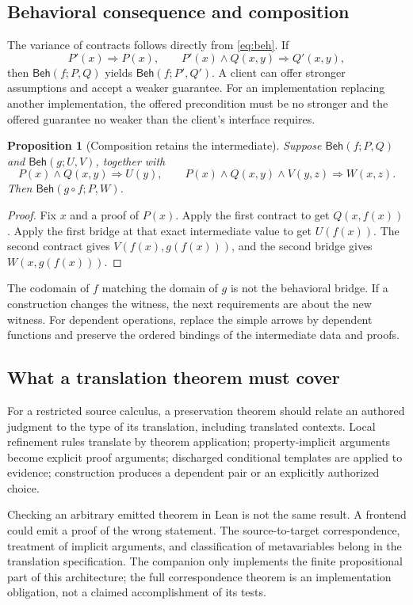 \documentclass[11pt,a4paper]{article}
\newcommand{\Beh}{\mathsf{Beh}}\newcommand{\Spec}{\mathsf{Spec}}
\newtheorem{proposition}[theorem]{Proposition}
\theoremstyle{definition}\newtheorem{definition}[theorem]{Definition}
\theoremstyle{remark}\newtheorem{remark}[theorem]{Remark}
\begin{document}
\subsection{Behavioral consequence and composition}
The variance of contracts follows directly from \eqref{eq:beh}. If
\[
 P'(x)\Rightarrow P(x),\qquad
 P'(x)\wedge Q(x,y)\Rightarrow Q'(x,y),
\]
then $\Beh(f;P,Q)$ yields $\Beh(f;P',Q')$. A client can offer stronger assumptions and accept a weaker guarantee. For an implementation replacing another implementation, the offered precondition must be no stronger and the offered guarantee no weaker than the client's interface requires.

\begin{proposition}[Composition retains the intermediate]\label{prop:compose}
Suppose $\Beh(f;P,Q)$ and $\Beh(g;U,V)$, together with
\[
 P(x)\wedge Q(x,y)\Rightarrow U(y),\qquad
 P(x)\wedge Q(x,y)\wedge V(y,z)\Rightarrow W(x,z).
\]
Then $\Beh(g\circ f;P,W)$.
\end{proposition}
\begin{proof}
Fix $x$ and a proof of $P(x)$. Apply the first contract to get $Q(x,f(x))$. Apply the first bridge at that exact intermediate value to get $U(f(x))$. The second contract gives $V(f(x),g(f(x)))$, and the second bridge gives $W(x,g(f(x)))$.
\end{proof}
The codomain of $f$ matching the domain of $g$ is not the behavioral bridge. If a construction changes the witness, the next requirements are about the new witness. For dependent operations, replace the simple arrows by dependent functions and preserve the ordered bindings of the intermediate data and proofs.

\subsection{What a translation theorem must cover}
For a restricted source calculus, a preservation theorem should relate an authored judgment to the type of its translation, including translated contexts. Local refinement rules translate by theorem application; property-implicit arguments become explicit proof arguments; discharged conditional templates are applied to evidence; construction produces a dependent pair or an explicitly authorized choice.

Checking an arbitrary emitted theorem in Lean is not the same result. A frontend could emit a proof of the wrong statement. The source-to-target correspondence, treatment of implicit arguments, and classification of metavariables belong in the translation specification. The companion only implements the finite propositional part of this architecture; the full correspondence theorem is an implementation obligation, not a claimed accomplishment of its tests.
\end{document}
